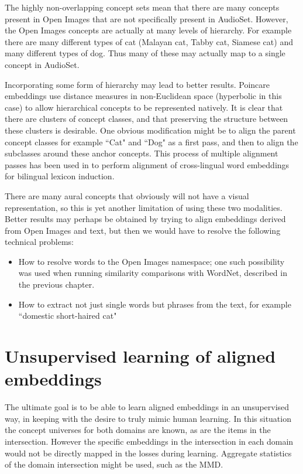 The highly non-overlapping concept sets mean that there are many concepts present in Open Images that are not specifically present in AudioSet. However, the Open Images concepts are actually at many levels of hierarchy. For example there are many different types of cat (Malayan cat, Tabby cat, Siamese cat) and many different types of dog. Thus many of these may actually map to a single concept in AudioSet. 

Incorporating some form of hierarchy may lead to better results. Poincare embeddings  use distance measures in non-Euclidean space (hyperbolic in this case) to allow hierarchical concepts to be represented natively. It is clear that there are clusters of concept classes, and that preserving the structure between these clusters is desirable. One obvious modification might be to align the parent concept classes for example ``Cat" and ``Dog" as a first pass, and then to align the subclasses around these anchor concepts. This process of multiple alignment passes has been used in \cite{UnsupervisedAlignmentWP} to perform alignment of cross-lingual word embeddings for bilingual lexicon induction. 

There are many aural concepts that obviously will not have a visual representation, so this is yet another limitation of using these two modalities. Better results may perhaps be obtained by trying to align embeddings derived from Open Images and text, but then we would have to resolve the following technical problems:

\begin{itemize}
    \item How to resolve words to the Open Images namespace; one such possibility was used when running similarity comparisons with WordNet, described in the previous chapter. 
    \item How to extract not just single words but phrases from the text, for example ``domestic short-haired cat"
\end{itemize}


\section{Unsupervised learning of aligned embeddings}

The ultimate goal is to be able to learn aligned embeddings in an unsupervised way, in keeping with the desire to truly mimic human learning. In this situation the concept universes for both domains are known, as are the items in the intersection. However the specific embeddings in the intersection in each domain would not be directly mapped in the losses during learning. Aggregate statistics of the domain intersection might be used, such as the MMD. 

